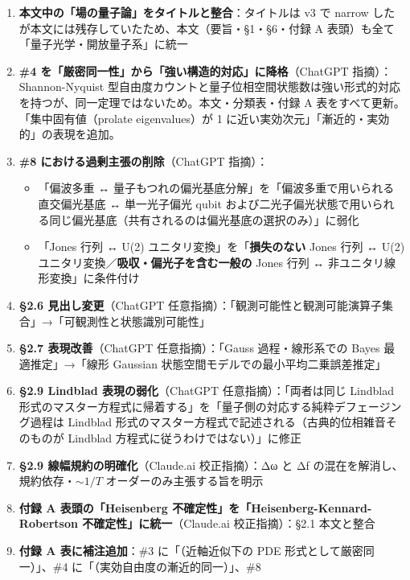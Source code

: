 \documentclass[
]{ltjsarticle}
\providecommand{\tightlist}{%
  \setlength{\itemsep}{0pt}\setlength{\parskip}{0pt}}
\begin{document}
\begin{enumerate}
\def\labelenumi{\arabic{enumi}.}
\tightlist
\item
  \textbf{本文中の「場の量子論」をタイトルと整合}：タイトルは v3 で
  narrow したが本文には残存していたため、本文（要旨・§1・§6・付録 A
  表頭）も全て「量子光学・開放量子系」に統一
\item
  \textbf{\#4 を「厳密同一性」から「強い構造的対応」に降格}（ChatGPT
  指摘）：Shannon-Nyquist
  型自由度カウントと量子位相空間状態数は強い形式的対応を持つが、同一定理ではないため。本文・分類表・付録
  A 表をすべて更新。「集中固有値（prolate eigenvalues）が 1
  に近い実効次元」「漸近的・実効的」の表現を追加。
\item
  \textbf{\#8 における過剰主張の削除}（ChatGPT 指摘）：

  \begin{itemize}
  \tightlist
  \item
    「偏波多重 ↔
    量子もつれの偏光基底分解」を「偏波多重で用いられる直交偏光基底 ↔
    単一光子偏光 qubit
    および二光子偏光状態で用いられる同じ偏光基底（共有されるのは偏光基底の選択のみ）」に弱化
  \item
    「Jones 行列 ↔ U(2) ユニタリ変換」を「\textbf{損失のない} Jones 行列
    ↔ U(2) ユニタリ変換／\textbf{吸収・偏光子を含む一般の} Jones 行列 ↔
    非ユニタリ線形変換」に条件付け
  \end{itemize}
\item
  \textbf{§2.6 見出し変更}（ChatGPT
  任意指摘）：「観測可能性と観測可能演算子集合」→「可観測性と状態識別可能性」
\item
  \textbf{§2.7 表現改善}（ChatGPT 任意指摘）：「Gauss 過程・線形系での
  Bayes 最適推定」→「線形 Gaussian
  状態空間モデルでの最小平均二乗誤差推定」
\item
  \textbf{§2.9 Lindblad 表現の弱化}（ChatGPT 任意指摘）：「両者は同じ
  Lindblad
  形式のマスター方程式に帰着する」を「量子側の対応する純粋デフェージング過程は
  Lindblad 形式のマスター方程式で記述される（古典的位相雑音そのものが
  Lindblad 方程式に従うわけではない）」に修正
\item
  \textbf{§2.9 線幅規約の明確化}（Claude.ai 校正指摘）：Δω と Δf
  の混在を解消し、規約依存・\(\sim 1/T\) オーダーのみ主張する旨を明示
\item
  \textbf{付録 A 表頭の「Heisenberg
  不確定性」を「Heisenberg-Kennard-Robertson
  不確定性」に統一}（Claude.ai 校正指摘）：§2.1 本文と整合
\item
  \textbf{付録 A 表に補注追加}：\#3 に「（近軸近似下の PDE
  形式として厳密同一）」、\#4 に「（実効自由度の漸近的同一）」、\#8

\end{enumerate}
\end{document}
